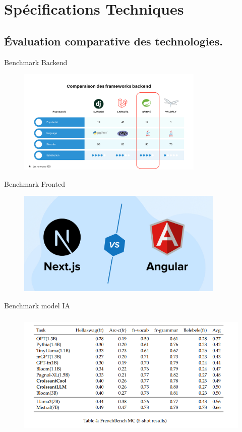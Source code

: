 \section{Spécifications Techniques}


\subsection{Évaluation comparative des technologies.}
\begin{frame}{Benchmark Backend}
    \begin{figure}[htpb]
        \centering
        \includegraphics[height=5cm]{assets/images/benchmark.png}
    \end{figure}
\end{frame}

\begin{frame}{Benchmark Fronted}
    \begin{figure}[htpb]
        \centering
        \includegraphics[height=5cm]{assets/images/bench-next.jpg}
    \end{figure}
\end{frame}

\begin{frame}{Benchmark model IA}
    \begin{figure}[htpb]
        \centering
        \includegraphics[height=6cm]{assets/images/ia_benchmark.png}
    \end{figure}
\end{frame}

